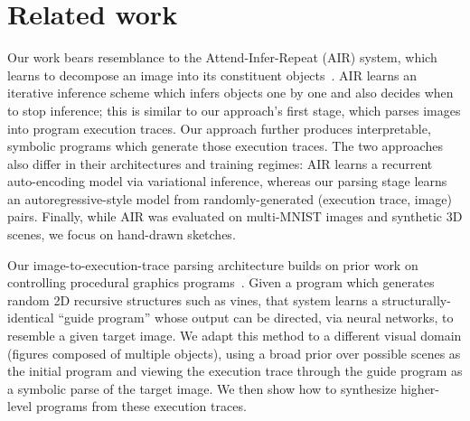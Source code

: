 \documentclass{article}
\newcommand{\remark}[1]{\textcolor{red}{[#1]}}
\begin{document}


\section{Related work}

Our work bears resemblance to the Attend-Infer-Repeat (AIR) system, which learns to decompose an image into its constituent objects~\cite{eslami1603attend}. AIR learns an iterative inference scheme which infers objects one by one and also decides when to stop inference; this is similar to our approach's first stage, which parses images into program execution traces. Our approach further produces interpretable, symbolic programs which generate those execution traces. The two approaches also differ in their architectures and training regimes: AIR learns a recurrent auto-encoding model via variational inference, whereas our parsing stage learns an autoregressive-style model from randomly-generated (execution trace, image) pairs. Finally, while AIR was evaluated on multi-MNIST images and synthetic 3D scenes, we focus on hand-drawn sketches.

Our image-to-execution-trace parsing architecture builds on prior work on controlling procedural graphics programs~\cite{ritchie2016neurally}. Given a program which generates random 2D recursive structures such as vines, that system learns a structurally-identical ``guide program'' whose output can be directed, via neural networks, to resemble a given target image. 
We adapt this method to a different visual domain (figures composed of multiple objects), using a broad prior over possible scenes as the initial program and viewing the execution trace through the guide program as a symbolic parse of the target image.
We then show how to synthesize higher-level programs from these execution traces.
\end{document}
